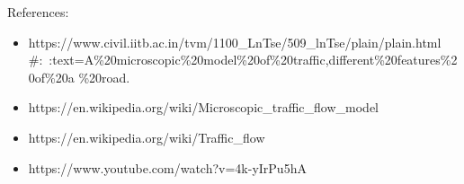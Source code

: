 \documentclass[12pt, letterpaper]{article}
\begin{document}
 References:
\begin{itemize}
 \item https://www.civil.iitb.ac.in/tvm/1100\_LnTse/509\_lnTse/plain/plain.html
 \#:~:text=A\%20microscopic\%20model\%20of\%20traffic,different\%20features\%20of\%20a
 \%20road.
 
\item  https://en.wikipedia.org/wiki/Microscopic\_traffic\_flow\_model
\item https://en.wikipedia.org/wiki/Traffic\_flow
\item https://www.youtube.com/watch?v=4k-yIrPu5hA
\end{itemize}
\end{document}

